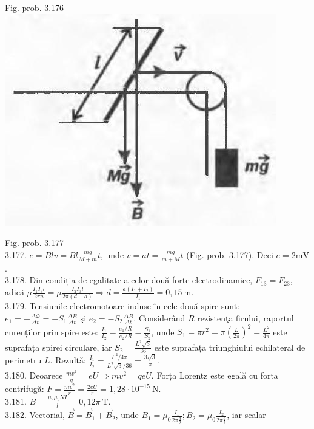 \documentclass[10pt]{article}
\begin{document}
Fig. prob. 3.176\\
\includegraphics[max width=\textwidth, center]{2025_07_01_5b3ff9fa0d508c8e9f17g-375(1)}

Fig. prob. 3.177\\
3.177. $e=B l v=B l \frac{m g}{M+m} t$, unde $v=a t=\frac{m g}{m+M} t$ (Fig. prob. 3.177). Deci $e=2 \mathrm{mV}$.\\
3.178. Din condiția de egalitate a celor două forțe electrodinamice, $F_{13}=F_{23}$, adicã $\mu \frac{I_{1} I_{3} l}{2 \pi a}=\mu \frac{I_{2} I_{3} l}{2 \pi(d-a)} \Rightarrow d=\frac{a\left(I_{1}+I_{2}\right)}{I_{1}}=0,15 \mathrm{~m}$.\\
3.179. Tensiunile electromotoare induse în cele două spire sunt: $e_{1}=-\frac{\Delta \Phi}{\Delta t}=-S_{1} \frac{\Delta B}{\Delta t}$ şi $e_{2}=-S_{2} \frac{\Delta B}{\Delta t}$. Considerând $R$ rezistenţa firului, raportul curenților prin spire este: $\frac{I_{1}}{I_{2}}=\frac{e_{1} / R}{e_{2} / R}=\frac{S_{1}}{S_{2}}$, unde $S_{1}=\pi r^{2}=\pi\left(\frac{L}{2 \pi}\right)^{2}=\frac{L^{2}}{4 \pi}$ este suprafața spirei circulare, iar $S_{2}=\frac{L^{2} \sqrt{3}}{36}$ este suprafața triunghiului echilateral de perimetru $L$. Rezultǎ: $\frac{I_{1}}{I_{2}}=\frac{L^{2} / 4 \pi}{L^{2} \sqrt{3} / 36}=\frac{3 \sqrt{3}}{\pi}$.\\
3.180. Deoarece $\frac{m v^{2}}{q}=e U \Rightarrow m v^{2}=q e U$. Forța Lorentz este egală cu forta centrifugă: $F=\frac{m v^{2}}{r}=\frac{2 e U}{r}=1,28 \cdot 10^{-15} \mathrm{~N}$.\\
3.181. $B=\frac{\mu_{0} \mu_{r} N I}{l}=0,12 \pi \mathrm{~T}$.\\
3.182. Vectorial, $\vec{B}=\vec{B}_{1}+\vec{B}_{2}$, unde $B_{1}=\mu_{0} \frac{I_{1}}{2 \pi \frac{d}{2}} ; B_{2}=\mu_{0} \frac{I_{2}}{2 \pi \frac{d}{2}}$, iar scalar
\end{document}
